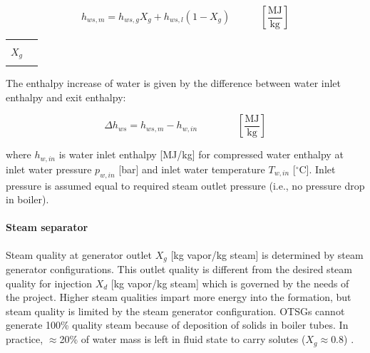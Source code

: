 \documentclass[11pt]{report}
\newcommand{\xlname}[1]{\raisebox{1pt}{\fcolorbox{light-gray}{light-gray}{\texttt{\textcolor{stanford}{\scriptsize{#1}}}}}}
\newcommand{\eqnunitfrac}[2]{\quad\quad \scriptstyle{\left[\frac{\text{#1}}{\text{#2}}\right]}}
\begin{document}
\begin{minipage}{0.6\columnwidth}
\begin{fleqn}[0pt]
\begin{equation}\label{eq:steam_h_mixed_gen_outlet}
h_{ws,m} = h_{ws,g}X_{g} + h_{ws,l}(1-X_{g}) \quad\eqnunitfrac{MJ}{kg}
\end{equation}
\end{fleqn}
\end{minipage}\hfill
\begin{minipage}{0.3\columnwidth}
        \begin{tabular}{|cl}
                        & \\
        $X_{g}$       & \xlname{Quality\_generator\_outlet}\\ 
                        & \\
        \end{tabular}
\end{minipage}


The enthalpy increase of water is given by the difference between water inlet enthalpy and exit enthalpy:

\begin{equation}\label{eq:steam_hw}
\Delta h_{ws} = h_{ws,m} - h_{w,in} \quad\quad\eqnunitfrac{MJ}{kg}
\end{equation}

where $h_{w,in}$ is water inlet enthalpy [MJ/kg] for compressed water enthalpy at inlet water pressure $p_{w,in}$ [bar] and inlet water temperature $T_{w,in}$ [$^\circ$C]. Inlet pressure is assumed equal to required steam outlet pressure (i.e., no pressure drop in boiler). 


\paragraph{Steam separator}
Steam quality at generator outlet $X_{g}$ [kg vapor/kg steam] is determined by steam generator configurations. This outlet quality is different from the desired steam quality for injection $X_{d}$ [kg vapor/kg steam] which is governed by the needs of the project. Higher steam qualities impart more energy into the formation, but steam quality is limited by the steam generator configuration. OTSGs cannot generate 100\% quality steam because of deposition of solids in boiler tubes. In practice, $\approx$20\% of water mass is left in fluid state to carry solutes ($X_{g} \approx 0.8$) \cite{Ganapathy2003}. 
\end{document}
